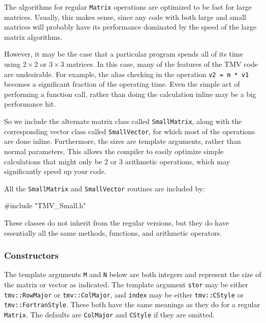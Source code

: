 \documentclass[twoside,letterpaper,11pt]{article}
\renewcommand{\tt}[1]{{\lstinline {#1}}}
\begin{document}
The algorithms for regular \tt{Matrix} operations are optimized to be
fast for large matrices.  Usually, this makes sense, since any code with
both large and small matrices will probably have its performance dominated
by the speed of the large matrix algorithms.

However, it may be the case that a particular program spends all of its
time using $2 \times 2$ or $3 \times 3$ matrices.  In this case, 
many of the features of the TMV code are undesirable.  For example, 
the alias checking in the operation \tt{v2 = m * v1} becomes a significant
fraction of the operating time.  Even the simple act of performing a function
call, rather than doing the calculation inline may be a big performance hit.

So we include the alternate matrix class called \tt{SmallMatrix}, along 
with the corresponding vector class called \tt{SmallVector}, for which most of 
the operations are done inline.  Furthermore, the sizes are template arguments,
rather than normal parameters.  This allows the compiler to easily optimize
simple calculations that might only be 2 or 3 arithmetic operations, which
may significantly speed up your code.

All the \tt{SmallMatrix} and \tt{SmallVector} routines are included by:
\begin{tmvcode}
#include "TMV_Small.h"
\end{tmvcode}

These classes do not inherit from the regular versions, but they do have 
essentially all the same methods, functions, and arithmetic operators. 

\subsubsection{Constructors}

The template arguments \tt{M} and \tt{N} below are both integers and
represent the size of the matrix or vector as indicated.
The template argument \tt{stor} may be either \tt{tmv::RowMajor} or
\tt{tmv::ColMajor}, and
 \tt{index} may be either \tt{tmv::CStyle} or
\tt{tmv::FortranStyle}.  These both have the same meanings as they do 
for a regular \tt{Matrix}. The defaults are \tt{ColMajor} and \tt{CStyle} if they
are omitted.
\end{document}
